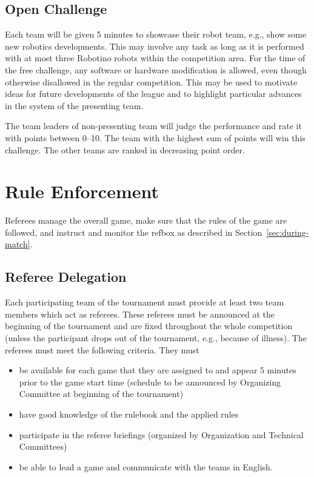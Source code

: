 \documentclass[12pt,twoside]{article}
\newcommand{\refsec}[1]{Section~\ref{#1}}
\begin{document}
\subsection{Open Challenge}\label{sec:open-challenge}
Each team will be given 5 minutes to showcase their robot team, e.g.,
show some new robotics developments. This may involve any task as long
as it is performed with at most three Robotino robots within the
competition area. For the time of the free challenge, any software or
hardware modification is allowed, even though otherwise disallowed in
the regular competition. This may be used to motivate ideas for future
developments of the league and to highlight particular advances in the
system of the presenting team.

The team leaders of non-presenting team will judge the performance and
rate it with points between 0--10.  The team with the highest sum of
points will win this challenge. The other teams are ranked in
decreasing point order.


\section{Rule Enforcement}
\label{sec:rule-enforcement}
Referees manage the overall game, make sure that the rules of the game
are followed, and instruct and monitor the \ac{refbox} as described in
\refsec{sec:during-match}.

\subsection{Referee Delegation}
Each participating team of the tournament must provide at least two
team members which act as referees. These referees must be announced
at the beginning of the tournament and are fixed throughout the whole
competition (unless the participant drops out of the tournament,
e.g., because of illness). The referees must meet the following
criteria. They must

\begin{itemize}
\item be available for each game that they are assigned to and appear
  5 minutes prior to the game start time (schedule to be announced by
  Organizing Committee at beginning of the tournament)
\item have good knowledge of the rulebook and the applied rules
\item participate in the referee briefings (organized by Organization
  and Technical Committees)
\item be able to lead a game and communicate with the teams in
  English.
\end{itemize}
\end{document}
